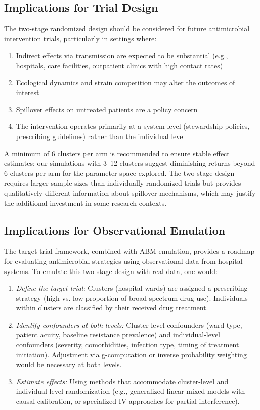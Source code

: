 \subsection{Implications for Trial Design}

The two-stage randomized design should be considered for future antimicrobial intervention trials, particularly
in settings where:
\begin{enumerate}
  \item Indirect effects via transmission are expected to be substantial (e.g., hospitals, care facilities, outpatient clinics with high contact rates)
  \item Ecological dynamics and strain competition may alter the outcomes of interest
  \item Spillover effects on untreated patients are a policy concern
  \item The intervention operates primarily at a system level (stewardship policies, prescribing guidelines) rather than the individual level
\end{enumerate}

A minimum of 6 clusters per arm is recommended to ensure stable effect estimates; our simulations with
3--12 clusters suggest diminishing returns beyond 6 clusters per arm for the parameter space explored.
The two-stage design requires larger sample sizes than individually randomized trials but provides
qualitatively different information about spillover mechanisms, which may justify the additional investment
in some research contexts.

\subsection{Implications for Observational Emulation}

The target trial framework, combined with ABM emulation, provides a roadmap for evaluating antimicrobial
strategies using observational data from hospital systems. To emulate this two-stage design with real data,
one would:

\begin{enumerate}
  \item \textit{Define the target trial:} Clusters (hospital wards) are assigned a prescribing strategy
  (high vs. low proportion of broad-spectrum drug use). Individuals within clusters are classified by their
  received drug treatment.

  \item \textit{Identify confounders at both levels:} Cluster-level confounders (ward type, patient acuity,
  baseline resistance prevalence) and individual-level confounders (severity, comorbidities, infection type,
  timing of treatment initiation). Adjustment via g-computation or inverse probability weighting would be
  necessary at both levels.

  \item \textit{Estimate effects:} Using methods that accommodate cluster-level and individual-level randomization
  (e.g., generalized linear mixed models with causal calibration, or specialized IV approaches for partial interference).
\end{enumerate}

